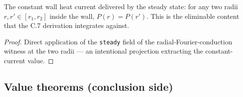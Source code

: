 \begin{lemma}
\label{lem:IPhO2026Problems_problem_IPhO_2026_4_C_7:RadialFourierConduction.wall_current}
The constant wall heat current delivered by the steady state: for any two
radii $r, r' \in [r_1, r_2]$ inside the wall, $P(r) = P(r')$. This is the
eliminable content that the C.7 derivation integrates against.
\end{lemma}
\begin{proof}
Direct application of the \texttt{steady} field of the
radial-Fourier-conduction witness at the two radii --- an intentional
projection extracting the constant-current value.
\end{proof}

\subsection*{Value theorems (conclusion side)}

